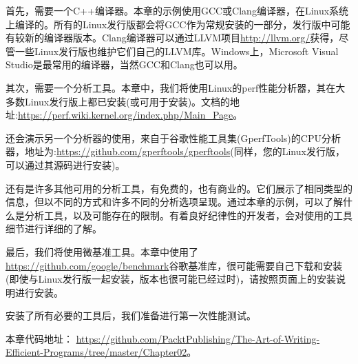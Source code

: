 首先，需要一个C++编译器。本章的示例使用GCC或Clang编译器，在Linux系统上编译的。所有的Linux发行版都会将GCC作为常规安装的一部分，发行版中可能有较新的编译器版本。Clang编译器可以通过LLVM项目\url{http://llvm.org/}获得，尽管一些Linux发行版也维护它们自己的LLVM库。Windows上，Microsoft Visual Studio是最常用的编译器，当然GCC和Clang也可以用。

其次，需要一个分析工具。本章中，我们将使用Linux的perf性能分析器，其在大多数Linux发行版上都已安装(或可用于安装)。文档的地址:\url{https://perf.wiki.kernel.org/index.php/Main_Page}。

还会演示另一个分析器的使用，来自于谷歌性能工具集(GperfTools)的CPU分析器，地址为:\url{https://github.com/gperftools/gperftools}(同样，您的Linux发行版，可以通过其源码进行安装)。

还有是许多其他可用的分析工具，有免费的，也有商业的。它们展示了相同类型的信息，但以不同的方式和许多不同的分析选项呈现。通过本章的示例，可以了解什么是分析工具，以及可能存在的限制。有着良好纪律性的开发者，会对使用的工具细节进行详细的了解。

最后，我们将使用微基准工具。本章中使用了\url{https://github.com/google/benchmark}谷歌基准库，很可能需要自己下载和安装(即使与Linux发行版一起安装，版本也很可能已经过时)，请按照页面上的安装说明进行安装。

安装了所有必要的工具后，我们准备进行第一次性能测试。

本章代码地址： \url{https://github.com/PacktPublishing/The-Art-of-Writing-Efficient-Programs/tree/master/Chapter02}。



